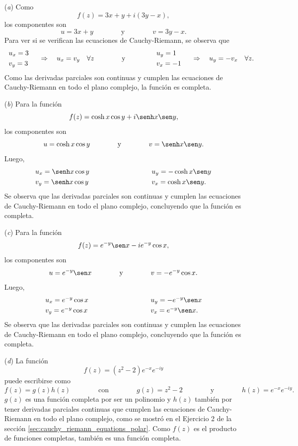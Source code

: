 \documentclass[a4paper]{report}
\begin{document}
\begin{enumerate}
 \item[(\textit{a})] Como
 \[
  f(z)=3x+y+i(3y-x),
 \]
 los componentes son 
 \[
  u=3x+y
  \qquad\qquad\textrm{y}\qquad\qquad
  v=3y-x.
 \]
 Para ver si se verifican las ecuaciones de Cauchy-Riemann, se observa que 
 \[
 \begin{array}{l}
  u_x=3\\[\smallskipamount]
  v_y=3
 \end{array}
 \quad\Rightarrow\quad u_x=v_y\quad\forall z
 \qquad\qquad\textrm{y}\qquad\qquad
 \begin{array}{l}
  u_y=1\\[\smallskipamount]
  v_x=-1
 \end{array}
 \quad\Rightarrow\quad u_y=-v_x\quad\forall z.
 \]
 Como las derivadas parciales son continuas y cumplen las ecuaciones de Cauchy-Riemann en todo el plano complejo, la función es completa.
 \item[(\textit{b})] Para la función
 \[
  f(z)=\cosh x\cos y+i\senh x\sen y,
 \]
 los componentes son 
 \[
  u=\cosh x\cos y
  \qquad\qquad\textrm{y}\qquad\qquad
  v=\senh x\sen y.
 \]
 Luego, 
 \[
 \begin{array}{ll}
  u_x=\senh x\cos y\qquad\qquad\qquad\qquad&u_y=-\cosh x\sen y\\[\smallskipamount]
  v_y=\senh x\cos y\qquad\qquad\qquad\qquad&v_x=\cosh x\sen y.
 \end{array}
 \]
 Se observa que las derivadas parciales son continuas y cumplen las ecuaciones de Cauchy-Riemann en todo el plano complejo, concluyendo que la función es completa. 
 \item[(\textit{c})] Para la función
 \[
  f(z)=e^{-y}\sen x-ie^{-y}\cos x,
 \]
 los componentes son 
 \[
  u=e^{-y}\sen x
  \qquad\qquad\textrm{y}\qquad\qquad
  v=-e^{-y}\cos x.
 \]
 Luego, 
 \[
 \begin{array}{ll}
  u_x=e^{-y}\cos x\qquad\qquad\qquad\qquad&u_y=-e^{-y}\sen x\\[\smallskipamount]
  v_y=e^{-y}\cos x\qquad\qquad\qquad\qquad&v_x=e^{-y}\sen x.
 \end{array}
 \]
 Se observa que las derivadas parciales son continuas y cumplen las ecuaciones de Cauchy-Riemann en todo el plano complejo, concluyendo que la función es completa.
 \item[(\textit{d})] La función
 \[
  f(z)=(z^2-2)e^{-x}e^{-iy}
 \]
 puede escribirse como
 \[
  f(z)=g(z)h(z)
  \qquad\qquad\textrm{con}\qquad\qquad
  g(z)=z^2-2
  \qquad\qquad\textrm{y}\qquad\qquad
  h(z)=e^{-x}e^{-iy}.
 \]
 \(g(z)\) es una función completa por ser un polinomio y \(h(z)\) también por tener derivadas parciales continuas que cumplen las ecuaciones de Cauchy-Riemann en todo el plano complejo, como se mostró en el Ejercicio 2 de la sección \ref{sec:cauchy_riemann_equations_polar}. Como \(f(z)\) es el producto de funciones completas, también es una función completa.
\end{enumerate} 
\end{document}
